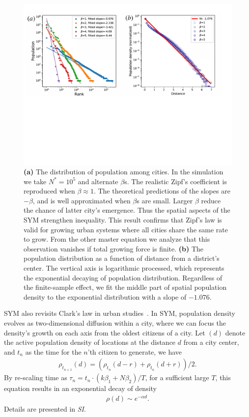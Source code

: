 \documentclass[reprint,unsortedaddress,amsmath,amssymb,aps,prl,showkeys]{revtex4-2}
\begin{document}
\begin{figure}[t]
	\centering
	\includegraphics[width = .99\linewidth]{pics/zipf_clark.pdf}
	\caption{\textbf{(a)} The distribution of population among cities. In the simulation we take $N^* = 10^5$ and alternate $\beta$s. The realistic Zipf's coefficient is reproduced when $\beta\approx 1$. The theoretical predictions of the slopes are $-\beta$, and is well approximated when $\beta$s are small. Larger $\beta$ reduce the chance of latter city's emergence. Thus the spatial aspects of the SYM strengthen inequality. This result confirms that Zipf's law is valid for growing urban systems where all cities share the same rate to grow. From the other master equation we analyze that this observation vanishes if total growing force is finite. \textbf{(b)} The population distribution as a function of distance from a district's center. The vertical axis is logarithmic processed, which represents the exponential decaying of population distribution. Regardless of the finite-sample effect, we fit the middle part of spatial population density to the exponential distribution with a slope of $-1.076$.}
	\label{Fig2}
\end{figure}

SYM also revisits Clark's law in urban studies~\cite{clark1951urban}. In SYM, population density evolves as two-dimensional diffusion within a city\cite{doi:10.1137/0150099}, where we can focus the density's growth on each axis from the oldest citizens of a city. Let $
(d)$ denote the active population density of locations at the distance $d$ from a city center, and $t_n$ as the time for the $n$'th citizen to generate, we have 
\begin{align}
	\rho_{t_{n+1}}(d) = (\rho_{t_{n}}(d-r) + \rho_{t_{n}}(d+r) )/2.\label{loc_den}  
\end{align} By re-scaling time as $\tau_n = t_n\cdot (k\beta_1+N\beta_2)/T$, for a sufficient large $T$, this equation results in an exponential decay of density
\begin{align}
	\rho(d)\sim e^{-\alpha d}\label{clark_eq}.
\end{align} Details are presented in \textit{SI}. 
\end{document}
